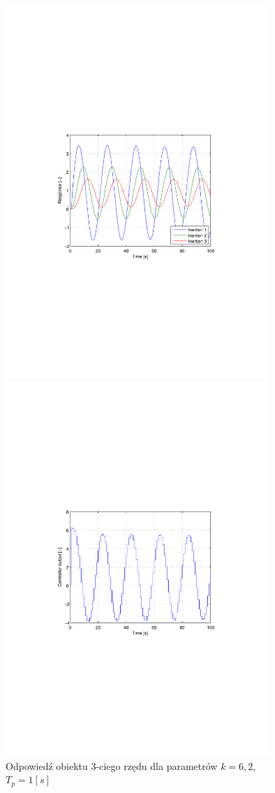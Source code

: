 \documentclass[12pt]{article}
\begin{document}
\newpage

\begin{figure}[!htb]
	\begin{center}
		\includegraphics[trim=5cm 9cm 5cm 9cm,width=10cm]{../res/img/d2_1_6,2y.pdf}
	\end{center}
	
	\begin{center}
		\includegraphics[trim=5cm 9cm 5cm 9cm,width=10cm]{../res/img/d2_1_6,2u.pdf} 
	\end{center}
	\caption{Odpowiedź obiektu 3-ciego rzędu dla parametrów $k=6,2$,
	$T_p=1[s]$}
\end{figure}
\end{document}
